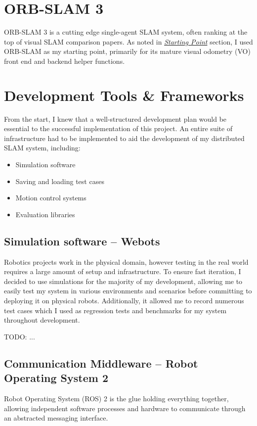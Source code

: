 \section{ORB-SLAM 3}
\label{sec:orb-slam-3}
ORB-SLAM 3 is a cutting edge single-agent SLAM system, often ranking at the top of visual SLAM comparison papers. As noted in \hyperref[sec:starting-point]{\textit{Starting Point}} section, I used ORB-SLAM as my starting point, primarily for its mature visual odometry (VO) front end and backend helper functions.

\section{Development Tools \& Frameworks}
\label{sec:development-tools-and-frameworks}
From the start, I knew that a well-structured development plan would be essential to the successful implementation of this project. An entire suite of infrastructure had to be implemented to aid the development of my distributed SLAM system, including: \noparskip
{
    \begin{itemize}[nosep]
        \item Simulation software
        \item Saving and loading test cases
        \item Motion control systems
        \item Evaluation libraries
    \end{itemize}
}

\subsection{Simulation software – Webots}
\label{sec:webots-simulator}

Robotics projects work in the physical domain, however testing in the real world requires a large amount of setup and infrastructure. To ensure fast iteration, I decided to use simulations for the majority of my development, allowing me to easily test my system in various environments and scenarios before committing to deploying it on physical robots. Additionally, it allowed me to record numerous test cases which I used as regression tests and benchmarks for my system throughout development.

TODO: ...


\subsection{Communication Middleware – Robot Operating System 2}
\label{sec:ros-2}
Robot Operating System (ROS) 2 is the glue holding everything together, allowing independent software processes and hardware to communicate through an abstracted messaging interface.

